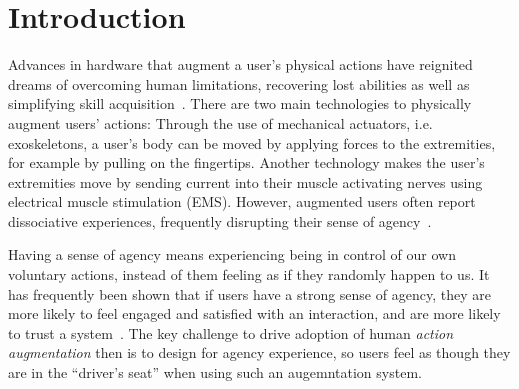 \section{Introduction}
Advances in hardware that augment a user's physical actions have reignited dreams of overcoming human limitations, recovering lost abilities as well as simplifying skill acquisition~\citep{Kasahara2019-sk, Goto2020-mw}. There are two main technologies to physically augment users' actions: Through the use of mechanical actuators, i.e. exoskeletons, a user's body can be moved by applying forces to the extremities, for example by pulling on the fingertips. Another technology makes the user's extremities move by sending current into their muscle activating nerves using electrical muscle stimulation (EMS). However, augmented users often report dissociative experiences, frequently disrupting their sense of agency~\citep{Gilbert2017-ze, Gilbert2019-uc}.

Having a sense of agency means experiencing being in control of our own voluntary actions, instead of them feeling as if they randomly happen to us. It has frequently been shown that if users have a strong sense of agency, they are more likely to feel engaged and satisfied with an interaction, and are more likely to trust a system~\citep{Berberian2012-do, Miller2007-rb}. The key challenge to drive adoption of human \textit{action augmentation} then is to design for agency experience, so users feel as though they are in the ``driver's seat'' when using such an augemntation system.

